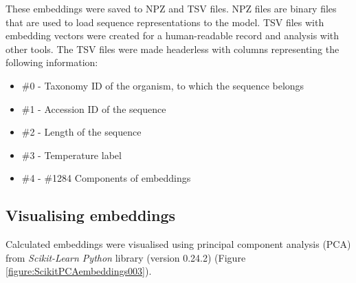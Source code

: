 \documentclass[12pt]{report}
\begin{document}
	These embeddings were saved to NPZ and TSV files. NPZ files are binary files
	that are used to load sequence representations to the model. TSV files with embedding vectors
	were created for a human-readable record and analysis with other tools. The TSV files
	were made headerless with columns representing the following information:

	\begin{itemize}
		\item \#0 - Taxonomy ID of the organism, to which the sequence belongs
		\item \#1 - Accession ID of the sequence
		\item \#2 - Length of the sequence
		\item \#3 - Temperature label
		\item \#4 - \#1284 Components of embeddings
	  \end{itemize}

	\subsection{Visualising embeddings}

	Calculated embeddings were visualised using principal component analysis (PCA)
	from \textit{Scikit-Learn Python} library (version 0.24.2) (Figure \ref{figure:ScikitPCAembeddings003}). 
\end{document}
